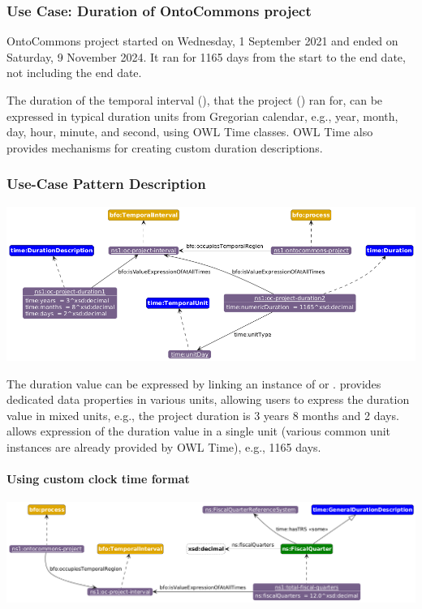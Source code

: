 \subsubsection*{Use Case: Duration of OntoCommons project} 
OntoCommons project started on Wednesday, 1 September 2021 and ended on Saturday, 9 November 2024. It ran for 1165 days from the start to the end date, not including the end date.

The duration of the temporal interval (), that the project () ran for, can be expressed in typical duration units from Gregorian calendar, e.g., year, month, day, hour, minute, and second, using OWL Time classes. OWL Time also provides mechanisms for creating custom duration descriptions. 

\subsubsection*{Use-Case Pattern Description}

\includegraphics[scale=0.40]{scenarios/time-duration/image/uc1-time-duration.png}

The duration value can be expressed by linking an instance of  or .  provides dedicated data properties in various units, allowing users to express the duration value in mixed units, e.g., the project duration is 3 years 8 months and 2 days.  allows expression of the duration value in a single unit (various common unit instances are already provided by OWL Time), e.g., 1165 days.

\paragraph{Using custom clock time format \\}

\includegraphics[scale=0.38]{scenarios/time-duration/image/uc2-custom-duration.png}

